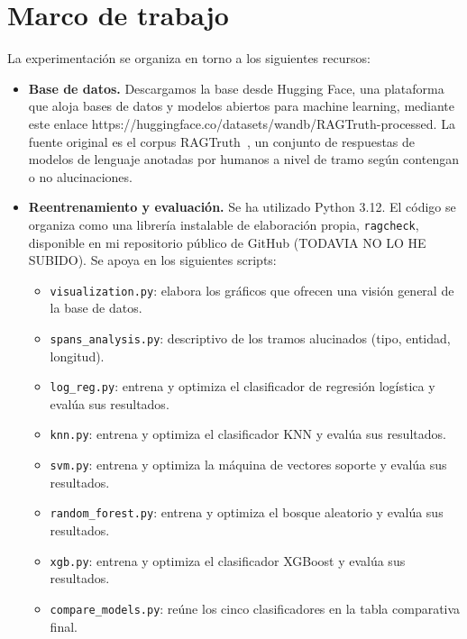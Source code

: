 \documentclass[12pt,a4paper]{report}
\theoremstyle{definition}
\newcommand{\tc}[1]{\texttt{#1}}
\begin{document}
\section{Marco de trabajo}

La experimentación se organiza en torno a los siguientes recursos:
\begin{itemize}
  \item \textbf{Base de datos.} Descargamos la base desde Hugging Face, una
plataforma que aloja bases de datos y modelos abiertos para machine learning, mediante este enlace https://huggingface.co/datasets/wandb/RAGTruth-processed. La fuente original es el corpus RAGTruth~\cite{niu2024ragtruth}, un
conjunto de respuestas de modelos de lenguaje anotadas por humanos a nivel de tramo según
contengan o no alucinaciones.

\item \textbf{Reentrenamiento y evaluación.} Se ha utilizado Python 3.12. El código se organiza como
una librería instalable de elaboración propia, \tc{ragcheck}, disponible en mi repositorio
público de GitHub (TODAVIA NO LO HE SUBIDO). Se apoya en los
siguientes scripts:
\begin{itemize}
  \item \tc{visualization.py}: elabora los gráficos que ofrecen una visión general de la base
        de datos.
  \item \tc{spans\_analysis.py}: descriptivo de los tramos alucinados (tipo, entidad, longitud).
  \item \tc{log\_reg.py}: entrena y optimiza el clasificador de regresión logística y evalúa sus
        resultados.
  \item \tc{knn.py}: entrena y optimiza el clasificador KNN y evalúa sus resultados.
  \item \tc{svm.py}: entrena y optimiza la máquina de vectores soporte y evalúa sus resultados.
  \item \tc{random\_forest.py}: entrena y optimiza el bosque aleatorio y evalúa sus resultados.
  \item \tc{xgb.py}: entrena y optimiza el clasificador XGBoost y evalúa sus resultados.
  \item \tc{compare\_models.py}: reúne los cinco clasificadores en la tabla comparativa final.
\end{itemize}


\end{itemize}
\end{document}
